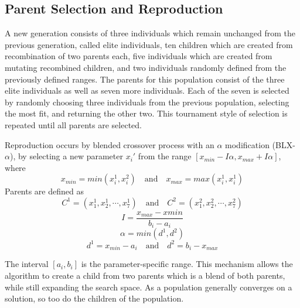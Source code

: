 \subsection{Parent Selection and Reproduction} A new generation consists of three individuals which remain
unchanged from the previous generation, called elite individuals, ten children which are created from
recombination of two parents each, five individuals which are created from mutating recombined children, and
two individuals randomly defined from the previously defined ranges.  The parents for this population consist
of the three elite individuals as well as seven more individuals. Each of the seven is selected by randomly
choosing three individuals from the previous population, selecting the most fit, and returning the other two.
This tournament style of selection is repeated until all parents are selected.

Reproduction occurs by blended crossover process with an $\alpha$ modification (BLX-$\alpha$), by selecting a
new parameter $x_i'$ from the range $[x_{min}-I\alpha,x_{max}+I\alpha]$, where \begin{displaymath}
x_{min}=min(x_i^1,x_i^2)\quad \mathrm{and} \quad x_{max}=max(x_i^1,x_i^1) \end{displaymath}
   Parents are defined as \begin{displaymath}
C^1=(x_1^1,x_2^1,\cdots,x_7^1)\quad\mathrm{and}\quad C^2=(x_1^2,x_2^2,\cdots,x_7^2) \end{displaymath}
  \begin{displaymath}
I=\frac{x_{max}-x{min}}{b_i-a_i} \end{displaymath} \begin{displaymath} \alpha=min(d^1,d^2) \end{displaymath}
\begin{displaymath} d^1=x_{min}-a_i\quad\mathrm{and}\quad d^2=b_i-x_{max} \end{displaymath}

The interval $[a_i,b_i]$ is the parameter-specific range. This mechanism allows the algorithm to create a
child from two parents which is a blend of both parents, while still expanding the search space. As a
population generally converges on a solution, so too do the children of the population.

